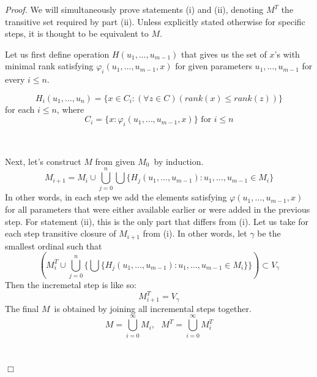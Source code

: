 \documentclass[12pt,a4paper]{article}
\newenvironment{proof}
{\noindent \textit{Proof.}}
{\hspace*{\fill} $\Box$}
\begin{document}
\begin{proof}
We will simultaneously prove statements (i) and (ii), denoting $M^T$ the transitive set required by part (ii). Unless explicitly stated otherwise for specific steps, it is thought to be equivalent to $M$.

Let us first define operation $H(u_1, \ldots, u_{m-1})$ that gives us the set of $x$'s with minimal rank satisfying $\varphi_i(u_1, \ldots, u_{m-1}, x)$ for given parameters $u_1, \ldots, u_{m-1}$ for every $i \leq n$.

\begin{equation}
H_i(u_1, \ldots, u_n) = \{x \in C_i: (\forall z \in C)(rank(x) \leq rank(z))\}
\end{equation}
for each $i \leq n$, where
\begin{equation}
C_i = \{x: \varphi_i(u_1, \ldots, u_{m-1}, x)\} \mbox{ for $i \leq n$}
\end{equation}

\

Next, let's construct $M$ from given $M_0$ by induction. 
\begin{equation}
M_{i+1} = M_i \cup \bigcup_{j=0}^{n} \bigcup \{H_j(u_1, \ldots, u_{m-1}): u_1, \ldots, u_{m-1} \in M_i\}
\end{equation}
In other words, in each step we add the elements satisfying $\varphi(u_1, \ldots, u_{m-1}, x)$ for all parameters that were either available earlier or were added in the previous step. 
For statement (ii), this is the only part that differs from (i). Let us take for each step transitive closure of $M_{i+1}$ from (i). In other words, let $\gamma$ be the smallest ordinal such that 
\begin{equation}
(M^T_i \cup \bigcup_{j=0}^{n} \{\bigcup\{H_j(u_1, \ldots, u_{m-1}): u_1, \ldots, u_{m-1} \in M_i\}\}) \subset V_\gamma
\end{equation}
Then the incremetal step is like so:
\begin{equation}
M^T_{i+1} = V_\gamma
\end{equation}
The final $M$ is obtained by joining all incremental steps together. 
\begin{equation}
M = \bigcup_{i=0}^{\infty} M_i, \mbox{  }M^T = \bigcup_{i=0}^{\infty} M^T_i
\end{equation}

\


\end{proof}
\end{document}
